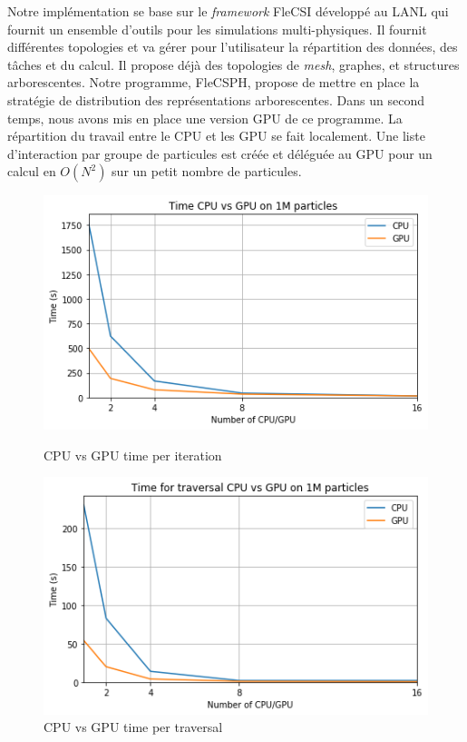 \documentclass[12pt,a4paper]{report}
\begin{document}
Notre implémentation se base sur le \textit{framework} FleCSI développé au LANL qui fournit un ensemble d'outils pour les simulations multi-physiques. 
Il fournit différentes topologies et va gérer pour l'utilisateur la répartition des données, des tâches et du calcul.
Il propose déjà des topologies de \textit{mesh}, graphes, et structures arborescentes. 
Notre programme, FleCSPH, propose de mettre en place la stratégie de distribution des représentations arborescentes. 
Dans un second temps, nous avons mis en place une version GPU de ce programme.
La répartition du travail entre le CPU et les GPU se fait localement. 
Une liste d'interaction par groupe de particules est créée et déléguée au GPU pour un calcul en $O(N^2)$ sur un petit nombre de particules. 
\begin{figure}[t!]
\centering
\begin{minipage}[b]{.45\textwidth}
\centering
	\includegraphics[width=\textwidth]{../figures/flecsph/time_CPU_vs_GPU.png}
	\caption{CPU vs GPU time per iteration}
	\label{fig:cpu_gpu_time}
\end{minipage}
\begin{minipage}[b]{.45\textwidth}
\centering
	\includegraphics[width=\textwidth]{../figures/flecsph/traversal_CPU_vs_GPU.png}
	\caption{CPU vs GPU time  per traversal}
	\label{fig:cpu_gpu_iter}
\end{minipage}
\end{figure}
\end{document}
